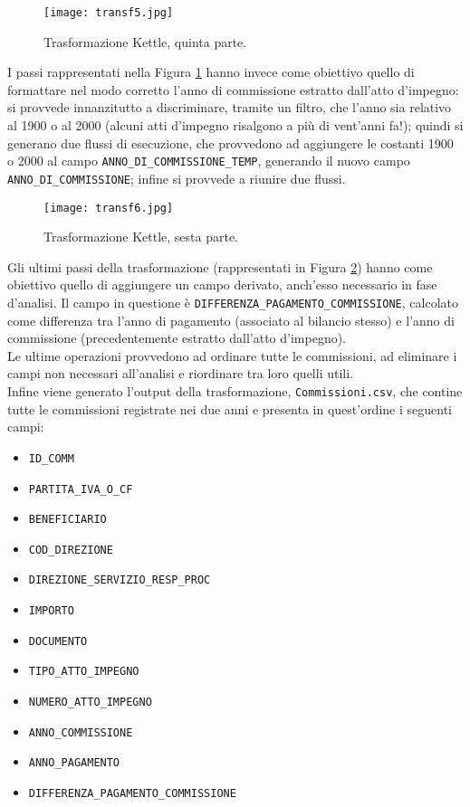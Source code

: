 		\begin{figure}[h!]
			\centering
				\texttt{[image: transf5.jpg]}
			\caption{Trasformazione Kettle, quinta parte.}
			\label{fig:transf5}
		\end{figure}
		
		I passi rappresentati nella Figura \ref{fig:transf5} hanno invece come obiettivo quello di formattare nel modo corretto l'anno di commissione estratto dall'atto d'impegno: si provvede innanzitutto a discriminare, tramite un filtro, che l'anno sia relativo al 1900 o al 2000 (alcuni atti d'impegno risalgono a più di vent'anni fa!); quindi si generano due flussi di esecuzione, che provvedono ad aggiungere le costanti 1900 o 2000 al campo \texttt{ANNO\_DI\_COMMISSIONE\_TEMP}, generando il nuovo campo \texttt{ANNO\_DI\_COMMISSIONE}; infine si provvede a riunire due flussi.
		
		\begin{figure}[h!]
			\centering
				\texttt{[image: transf6.jpg]}
			\caption{Trasformazione Kettle, sesta parte.}
			\label{fig:transf6}
		\end{figure}
		
		Gli ultimi passi della trasformazione (rappresentati in Figura \ref{fig:transf6}) hanno come obiettivo quello di aggiungere un campo derivato, anch'esso necessario in fase d'analisi. Il campo in questione è \texttt{DIFFERENZA\_PAGAMENTO\_COMMISSIONE}, calcolato come differenza tra l'anno di pagamento (associato al bilancio stesso) e l'anno di commissione (precedentemente estratto dall'atto d'impegno).\\
		Le ultime operazioni provvedono ad ordinare tutte le commissioni, ad eliminare i campi non necessari all'analisi e riordinare tra loro quelli utili.\\
		Infine viene generato l'output della trasformazione, \texttt{Commissioni.csv}, che contine tutte le commissioni registrate nei due anni e presenta in quest'ordine i seguenti campi:
		\begin{itemize}
			\item \texttt{ID\_COMM}
			\item \texttt{PARTITA\_IVA\_O\_CF}
			\item \texttt{BENEFICIARIO}
			\item \texttt{COD\_DIREZIONE}
			\item \texttt{DIREZIONE\_SERVIZIO\_RESP\_PROC}
			\item \texttt{IMPORTO}
			\item \texttt{DOCUMENTO}
			\item \texttt{TIPO\_ATTO\_IMPEGNO}
			\item \texttt{NUMERO\_ATTO\_IMPEGNO}
			\item \texttt{ANNO\_COMMISSIONE}
			\item \texttt{ANNO\_PAGAMENTO}
			\item \texttt{DIFFERENZA\_PAGAMENTO\_COMMISSIONE}
		\end{itemize}
		
